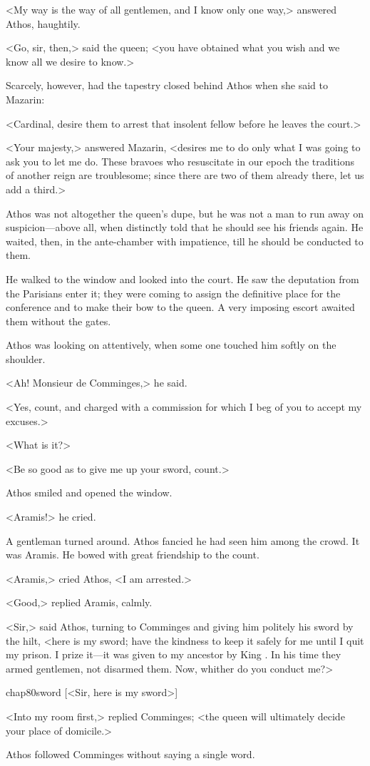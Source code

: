 <My way is the way of all gentlemen, and I know only one way,> answered Athos, haughtily.

<Go, sir, then,> said the queen; <you have obtained what you wish and we know all we desire to know.>

Scarcely, however, had the tapestry closed behind Athos when she said to Mazarin:

<Cardinal, desire them to arrest that insolent fellow before he leaves the court.>

<Your majesty,> answered Mazarin, <desires me to do only what I was going to ask you to let me do. These bravoes who resuscitate in our epoch the traditions of another reign are troublesome; since there are two of them already there, let us add a third.>

Athos was not altogether the queen's dupe, but he was not a man to run away on suspicion—above all, when distinctly told that he should see his friends again. He waited, then, in the ante-chamber with impatience, till he should be conducted to them.

He walked to the window and looked into the court. He saw the deputation from the Parisians enter it; they were coming to assign the definitive place for the conference and to make their bow to the queen. A very imposing escort awaited them without the gates.

Athos was looking on attentively, when some one touched him softly on the shoulder.

<Ah! Monsieur de Comminges,> he said.

<Yes, count, and charged with a commission for which I beg of you to accept my excuses.>

<What is it?>

<Be so good as to give me up your sword, count.>

Athos smiled and opened the window.

<Aramis!> he cried.

A gentleman turned around. Athos fancied he had seen him among the crowd. It was Aramis. He bowed with great friendship to the count.

<Aramis,> cried Athos, <I am arrested.>

<Good,> replied Aramis, calmly.

<Sir,> said Athos, turning to Comminges and giving him politely his sword by the hilt, <here is my sword; have the kindness to keep it safely for me until I quit my prison. I prize it—it was given to my ancestor by King . In his time they armed gentlemen, not disarmed them. Now, whither do you conduct me?>

\begin{bwbigpic}
	[\basicscale] 
	{chap80sword}
	[<Sir, here is my sword>]
\end{bwbigpic}

<Into my room first,> replied Comminges; <the queen will ultimately decide your place of domicile.>

Athos followed Comminges without saying a single word. 